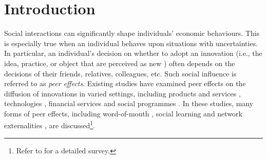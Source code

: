 \documentclass{bmcart}
\begin{document}
\begin{frontmatter}
\begin{abstractbox}

\end{abstractbox}

\begin{keyword}
\end{keyword}


%

\end{frontmatter}



\section*{Introduction}
Social interactions can significantly shape individuals' economic behaviours. This is especially true when an individual behaves upon situations with uncertainties. In particular, an individual's decision on whether to adopt an innovation (i.e., the idea, practice, or object that are perceived as new \cite{Rogers2003}) often depends on the decisions of their friends, relatives, colleagues, etc. Such social influence is referred to as \emph{peer effects}. Existing studies have examined peer effects on the diffusion of innovations in varied settings, including products and services \cite{Goolsbee1999, Sorensen2006, Kremer2008, Luan2009}, technologies \cite{Munshi2004, Bandiera2006, Conley2010}, financial services \cite{Banerjee2013} and social programmes \cite{Dahl2014}. In these studies, many forms of peer effects, including word-of-mouth \cite{Luan2009, Banerjee2013}, social learning \cite{Bandiera2006, Conley2010} and network externalities \cite{Goolsbee1999}, are discussed\footnote{Refer to \cite{Xiong2016} for a detailed survey.}. 
\end{document}
